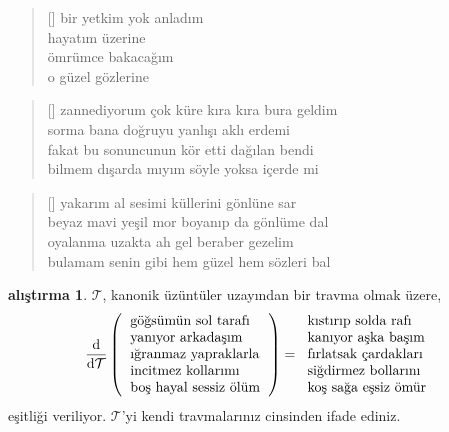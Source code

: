 \documentclass[10pt, openright, twoside]{memoir}
\theoremstyle{definition}
\newtheorem*{alistirma}{alıştırma}
\begin{document}
\vspace*{\fill}
%
\newpage
{}
\vspace*{\fill}
\settowidth{\versewidth}{bir yetkim yok anladım}
\begin{verse}[\versewidth]
  bir yetkim yok anladım \\
  hayatım üzerine \\
  ömrümce bakacağım \\
  o güzel gözlerine
\end{verse}
\vspace*{\fill}
%
\newpage
{}
\vspace*{\fill}
\settowidth{\versewidth}{zannediyorum çok küre kıra kıra bura geldim}
\begin{verse}[\versewidth]
  zannediyorum çok küre kıra kıra bura geldim \\
  sorma bana doğruyu yanlışı aklı erdemi \\
  fakat bu sonuncunun kör etti dağılan bendi \\
  bilmem dışarda mıyım söyle yoksa içerde mi
\end{verse}
\vspace*{\fill}
%
\newpage
{}
\vspace*{\fill}
\settowidth{\versewidth}{bulamam senin gibi hem güzel hem sözleri bal}
\begin{verse}[\versewidth]
  yakarım al sesimi küllerini gönlüne sar \\
  beyaz mavi yeşil mor boyanıp da gönlüme dal \\
  oyalanma uzakta ah gel beraber gezelim \\
  bulamam senin gibi hem güzel hem sözleri bal
\end{verse}
\vspace*{\fill}
%
\newpage
{}
\vspace*{\fill}
\begin{alistirma}
  \(\mathcal{T}\), kanonik üzüntüler uzayından bir travma olmak üzere,
  \[
    \dv{\mathcal{T}}
    \left(
      \begin{tabular}{l}
        göğsümün sol tarafı \\
        yanıyor arkadaşım \\
        ığranmaz yapraklarla \\
        incitmez kollarımı \\
        boş hayal sessiz ölüm
      \end{tabular}
    \right)
    =
    \begin{tabular}{l}
      kıstırıp solda rafı \\
      kanıyor aşka başım \\
      fırlatsak çardakları \\
      siğdirmez bollarını \\
      koş sağa eşsiz ömür
    \end{tabular}
  \]
  eşitliği veriliyor. $\mathcal{T}$'yi kendi travmalarınız cinsinden ifade
  ediniz.
\end{alistirma}
\end{document}
